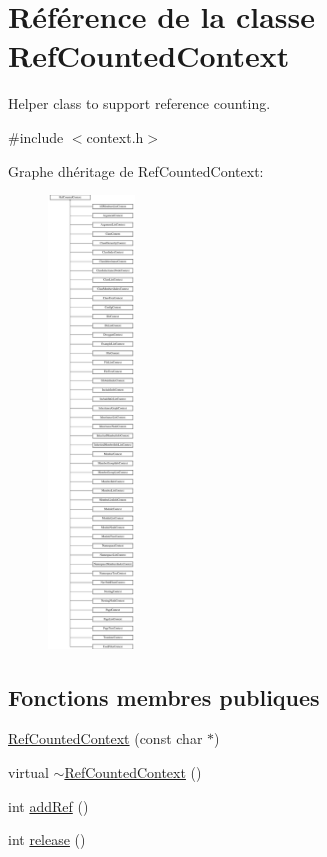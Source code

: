 \hypertarget{class_ref_counted_context}{}\section{Référence de la classe Ref\+Counted\+Context}
\label{class_ref_counted_context}


Helper class to support reference counting.  




{\ttfamily \#include $<$context.\+h$>$}

Graphe d\textquotesingle{}héritage de Ref\+Counted\+Context\+:\begin{figure}[H]
\begin{center}
\leavevmode
\includegraphics[height=12.000000cm]{class_ref_counted_context}
\end{center}
\end{figure}
\subsection*{Fonctions membres publiques}
\begin{DoxyCompactItemize}
\item 
\hyperlink{class_ref_counted_context_aef6fa38627d64e64a50c73786145e327}{Ref\+Counted\+Context} (const char $\ast$)
\item 
virtual \hyperlink{class_ref_counted_context_ad44fc779f84c047fee61de4c3af46bb8}{$\sim$\+Ref\+Counted\+Context} ()
\item 
int \hyperlink{class_ref_counted_context_a12b3c6dbc5ed3c5907077f064b47dda5}{add\+Ref} ()
\item 
int \hyperlink{class_ref_counted_context_a4d3c95432a22dc50de64bd2213405b22}{release} ()
\end{DoxyCompactItemize}


